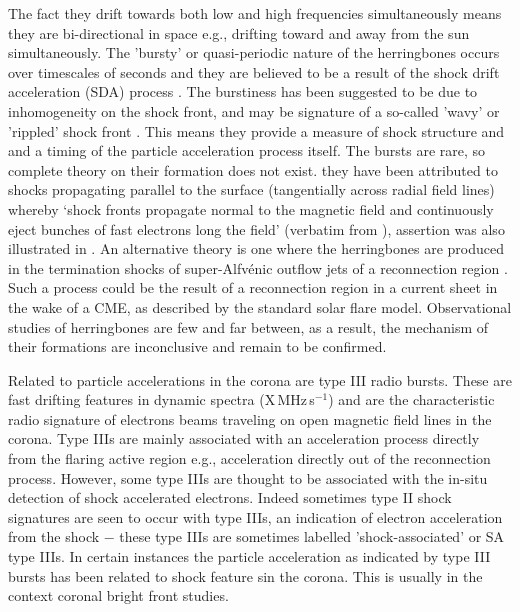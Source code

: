 The fact they drift towards both low and high frequencies simultaneously means they are bi-directional in space e.g., drifting toward and away from the sun simultaneously. The 'bursty' or quasi-periodic nature of the herringbones occurs over timescales of seconds \citep{mann1995, mann2005} and they are believed to be a result of the shock drift acceleration (SDA) process \citep{miteva2007}. The burstiness has been suggested to be due to inhomogeneity on the shock front, and may be signature of a so-called 'wavy' or 'rippled' shock front \citep{zlobec1993, guo2010, vandas2011}. This means they provide a measure of shock structure and and a timing of the particle acceleration process itself. The bursts are rare, so complete theory on their formation does not exist. they have been attributed to shocks propagating parallel to the surface (tangentially across radial field lines) whereby \textquoteleft shock fronts propagate normal to the magnetic field and continuously eject bunches of fast electrons long the field' (verbatim from \citet{wild1964}), assertion was also illustrated in \citet{stewart1980}. An alternative theory is one where the herringbones are produced in the termination shocks of super-Alfv\'{e}nic outflow jets of a reconnection region \citep{aurass2002, aurass2004}. Such a process could be the result of a reconnection region in a current sheet in the wake of a CME, as described by the standard solar flare model. Observational studies of herringbones are few and far between, as a result, the mechanism of their formations are inconclusive and remain to be confirmed.

Related to particle accelerations in the corona are type III radio bursts. These are fast drifting features in dynamic spectra (X\,MHz\,s$^{-1}$) and are the characteristic radio signature of electrons beams traveling on open magnetic field lines in the corona. Type IIIs are mainly associated with an acceleration process directly from the flaring active region e.g., acceleration directly out of the reconnection process. However, some type IIIs are thought to be associated with the in-situ detection of shock accelerated electrons. Indeed sometimes type II shock signatures are seen to occur with type IIIs, an indication of electron acceleration from the shock $-$ these type IIIs are sometimes labelled 'shock-associated' or SA type IIIs. In certain instances the particle acceleration as indicated by type III bursts has been related to shock feature sin the corona. This is usually in the context coronal bright front studies.

